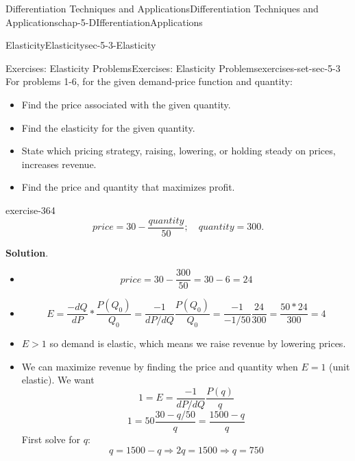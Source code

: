 \documentclass[oneside,10pt,]{book}
\numberwithin{equation}{section}
\newcommand{\gt}{>}
\begin{document}
\begin{chapterptx}{Differentiation Techniques and Applications}{}{Differentiation Techniques and Applications}{}{}{chap-5-DIfferentiationApplications}
\begin{sectionptx}{Elasticity}{}{Elasticity}{}{}{sec-5-3-Elasticity}
\begin{exercises-subsection-numberless}{Exercises: Elasticity Problems}{}{Exercises: Elasticity Problems}{}{}{exercises-set-sec-5-3}
\hypertarget{p-2063}{}%
For problems 1-6, for the given demand-price function and quantity:%
\leavevmode%
\begin{itemize}[label=\textbullet]
\item{}\hypertarget{p-2064}{}%
Find the price associated with the given quantity.%
\item{}\hypertarget{p-2065}{}%
Find the elasticity for the given quantity.%
\item{}\hypertarget{p-2066}{}%
State which pricing strategy, raising, lowering, or holding steady on prices, increases revenue.%
\item{}\hypertarget{p-2067}{}%
Find the price and quantity that maximizes profit.%
\end{itemize}
\begin{divisionexercise}{1}{}{}{exercise-364}%
%
\begin{equation*}
price=30-\frac{quantity}{50};\quad quantity=300.
\end{equation*}
\par\smallskip%
\noindent\textbf{Solution}.\hypertarget{solution-183}{}\quad%
\leavevmode%
\begin{itemize}[label=\textbullet]
\item{}%
\begin{equation*}
price=30-\frac{300}{50}=30-6=24
\end{equation*}
%
\item{}%
\begin{equation*}
E=\frac{-d Q}{d P}*\frac{P(Q_0 )}{Q_0} = \frac{-1}{dP/dQ} \frac{P(Q_0 )}{Q_0} = \frac{-1}{-1/50}  \frac{24}{300}=\frac{50*24}{300}=4
\end{equation*}
%
\item{}\hypertarget{p-2068}{}%
\(E \gt 1\) so demand is elastic, which means we raise revenue by lowering prices.%
\item{}\hypertarget{p-2069}{}%
We can maximize revenue by finding the price and quantity when \(E = 1\) (unit elastic).  We want%
%
\begin{equation*}
1=E=\frac{-1}{dP/dQ}\frac{P(q)}{q}
\end{equation*}
%
\begin{equation*}
1=50 \frac{30-q/50}{q}=\frac{1500-q}{q}
\end{equation*}
\hypertarget{p-2070}{}%
First solve for \(q\):%
%
\begin{equation*}
q=1500-q \Longrightarrow     2q=1500 \Longrightarrow   q=750 
\end{equation*}
\hypertarget{p-2071}{}%

\end{itemize}
\end{divisionexercise}
\end{exercises-subsection-numberless}
\end{sectionptx}
\end{chapterptx}
\end{document}
